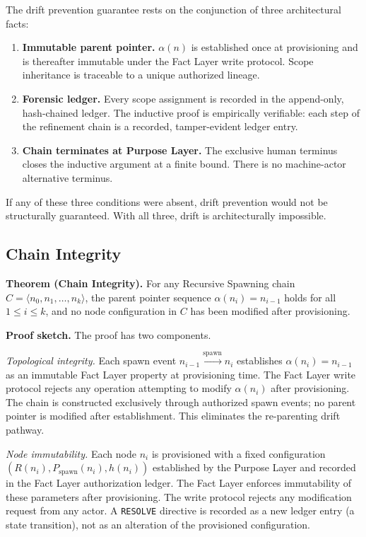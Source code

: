 \medskip
The drift prevention guarantee rests on the conjunction of three architectural facts:

\begin{enumerate}
    \item[(1)] \textbf{Immutable parent pointer.} $\alpha(n)$ is established once at provisioning and is thereafter immutable under the Fact Layer write protocol. Scope inheritance is traceable to a unique authorized lineage.
    \item[(2)] \textbf{Forensic ledger.} Every scope assignment is recorded in the append-only, hash-chained ledger. The inductive proof is empirically verifiable: each step of the refinement chain is a recorded, tamper-evident ledger entry.
    \item[(3)] \textbf{Chain terminates at Purpose Layer.} The exclusive human terminus closes the inductive argument at a finite bound. There is no machine-actor alternative terminus.
\end{enumerate}

If any of these three conditions were absent, drift prevention would not be structurally guaranteed. With all three, drift is architecturally impossible.

\subsection{Chain Integrity}
\label{sec:rs-chain-integrity}

\medskip
\noindent\textbf{Theorem (Chain Integrity).} For any Recursive Spawning chain $C = \langle n_0, n_1, \ldots, n_k \rangle$, the parent pointer sequence $\alpha(n_i) = n_{i-1}$ holds for all $1 \leq i \leq k$, and no node configuration in $C$ has been modified after provisioning.

\medskip
\noindent\textbf{Proof sketch.} The proof has two components.

\medskip
\textit{Topological integrity.} Each spawn event $n_{i-1} \xrightarrow{\mathrm{spawn}} n_i$ establishes $\alpha(n_i) = n_{i-1}$ as an immutable Fact Layer property at provisioning time. The Fact Layer write protocol rejects any operation attempting to modify $\alpha(n_i)$ after provisioning. The chain is constructed exclusively through authorized spawn events; no parent pointer is modified after establishment. This eliminates the re-parenting drift pathway.

\medskip
\textit{Node immutability.} Each node $n_i$ is provisioned with a fixed configuration $(R(n_i), P_{\mathrm{spawn}}(n_i), h(n_i))$ established by the Purpose Layer and recorded in the Fact Layer authorization ledger. The Fact Layer enforces immutability of these parameters after provisioning. The write protocol rejects any modification request from any actor. A \texttt{RESOLVE} directive is recorded as a new ledger entry (a state transition), not as an alteration of the provisioned configuration.

